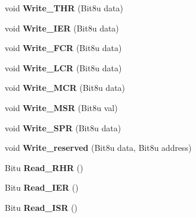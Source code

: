 \begin{DoxyCompactItemize}
\item 
\hypertarget{classCSerial_a8e7597eb951ddc04d0778765ae9fd05f}{void {\bfseries Write\-\_\-\-T\-H\-R} (Bit8u data)}\label{classCSerial_a8e7597eb951ddc04d0778765ae9fd05f}

\item 
\hypertarget{classCSerial_ade69b9fe0ccc79ab266b11ab32872dd8}{void {\bfseries Write\-\_\-\-I\-E\-R} (Bit8u data)}\label{classCSerial_ade69b9fe0ccc79ab266b11ab32872dd8}

\item 
\hypertarget{classCSerial_a9eb41bc2d20464ce68e22579b47f291d}{void {\bfseries Write\-\_\-\-F\-C\-R} (Bit8u data)}\label{classCSerial_a9eb41bc2d20464ce68e22579b47f291d}

\item 
\hypertarget{classCSerial_a28616544f272ab054298621561447924}{void {\bfseries Write\-\_\-\-L\-C\-R} (Bit8u data)}\label{classCSerial_a28616544f272ab054298621561447924}

\item 
\hypertarget{classCSerial_a4f95a3cccb9403edb4947e6de6101346}{void {\bfseries Write\-\_\-\-M\-C\-R} (Bit8u data)}\label{classCSerial_a4f95a3cccb9403edb4947e6de6101346}

\item 
\hypertarget{classCSerial_a3b1051945b94e795f2973f71c99b527e}{void {\bfseries Write\-\_\-\-M\-S\-R} (Bit8u val)}\label{classCSerial_a3b1051945b94e795f2973f71c99b527e}

\item 
\hypertarget{classCSerial_ae27c570b7bcd4c5ac6e0f4c4a5ff2045}{void {\bfseries Write\-\_\-\-S\-P\-R} (Bit8u data)}\label{classCSerial_ae27c570b7bcd4c5ac6e0f4c4a5ff2045}

\item 
\hypertarget{classCSerial_a28e4f958e7b7edc46a295d2fe5c7dbc8}{void {\bfseries Write\-\_\-reserved} (Bit8u data, Bit8u address)}\label{classCSerial_a28e4f958e7b7edc46a295d2fe5c7dbc8}

\item 
\hypertarget{classCSerial_ade498e8c549ed48e8001bcfce6771fe0}{Bitu {\bfseries Read\-\_\-\-R\-H\-R} ()}\label{classCSerial_ade498e8c549ed48e8001bcfce6771fe0}

\item 
\hypertarget{classCSerial_a35867fc7d933b6dfe45c566d6fea5619}{Bitu {\bfseries Read\-\_\-\-I\-E\-R} ()}\label{classCSerial_a35867fc7d933b6dfe45c566d6fea5619}

\item 
\hypertarget{classCSerial_a9ca17032de727b3288f09169bcdeee2f}{Bitu {\bfseries Read\-\_\-\-I\-S\-R} ()}\label{classCSerial_a9ca17032de727b3288f09169bcdeee2f}


\end{DoxyCompactItemize}
